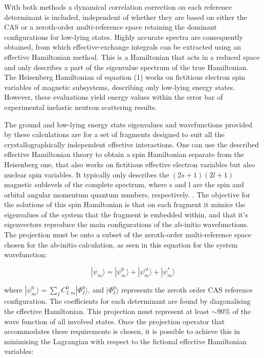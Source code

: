 \documentclass[10pt]{article}
\begin{document}

With both methods a dynamical correlation correction on each reference determinant is included, independent of whether they are based on either the CAS or a zeroth-order multi-reference space retaining the dominant configurations for low-lying states. Highly accurate spectra are consequently obtained, from which effective-exchange integrals can be extracted using an effective Hamiltonian method. This is a Hamiltonian that acts in a reduced space and only describes a part of the eigenvalue spectrum of the true Hamiltonian. The Heisenberg Hamiltonian of equation (1) works on fictitious electron spin variables of magnetic subsystems, describing only low-lying energy states. However, these evaluations yield energy values within the error bar of experimental inelastic neutron scattering results.

The ground and low-lying energy state eigenvalues and wavefunctions provided by these calculations are for a set of fragments designed to suit all the crystallographically independent effective interactions. One can use the described effective Hamiltonian theory to obtain a spin Hamiltonian separate from the Heisenberg one, that also works on fictitious effective electron variables but also nuclear spin variables. It typically only describes the $(2s+1)(2l+1)$ magnetic sublevels of the complete spectrum, where s and l are the spin and orbital angular momentum quantum numbers, respectively. \cite{mostafanejad2014basics}. The objective for the solutions of this spin Hamiltonian is that on each fragment it mimics the eigenvalues of the system that the fragment is embedded within, and that it's eigenvectors reproduce the main configurations of the ab-initio wavefunctions. The projection must be onto a subset of the zeroth-order multi-reference space chosen for the ab-initio calculation, as seen in this equation for the system wavefunction\cite{gelle2009accurate}:

\begin{equation*}
	|\psi_m\rangle = |\psi^0_m\rangle + |\psi^{ct}_m\rangle + |\psi^*_m\rangle
\end{equation*}

where $|\psi^0_m\rangle = \sum_{I}C^0_{I,m}|\Phi^0_I\rangle$, and $|\Phi^0_I\rangle$ represents the zeroth order CAS reference configuration. The coefficients for each determinant are found by diagonalising the effective Hamiltonian. This projection must represent at least $\sim90\%$ of the wave function of all involved states. Once the projection operator that accommodates these requirements is chosen, it is possible to achieve this in minimising the Lagrangian with respect to the fictional effective Hamiltonian variables:
\end{document}
